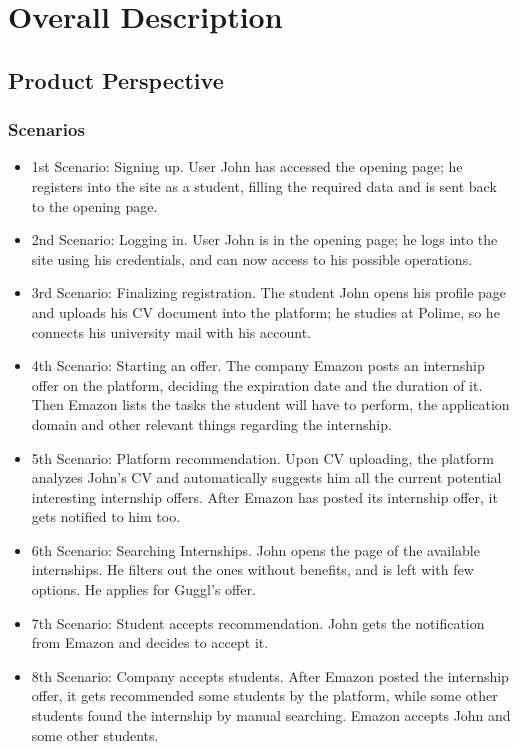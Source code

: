 \documentclass{article}
\begin{document}
\section{Overall Description}
\subsection{Product Perspective}
\subsubsection{Scenarios}
    \begin{itemize}
        \item 1st Scenario: Signing up. User John has accessed the opening page; he registers into the site as a student, filling the required data and is sent back to the opening page.
        \item 2nd Scenario: Logging in. User John is in the opening page; he logs into the site using his credentials, and can now access to his possible operations.
        \item 3rd Scenario: Finalizing registration. The student John opens his profile page and uploads his CV document into the platform; he studies at Polime, so he connects his university mail with his account.
        \item 4th Scenario: Starting an offer. The company Emazon posts an internship offer on the platform, deciding the expiration date and the duration of it. Then Emazon lists the tasks the student will have to perform, the application domain and other relevant things regarding the internship.  
        \item 5th Scenario: Platform recommendation. Upon CV uploading, the   platform analyzes John's CV and automatically suggests him all the current potential interesting internship offers. After Emazon has posted its internship offer, it gets notified to him too.
        \item 6th Scenario: Searching Internships. John opens the page of the available internships. He filters out the ones without benefits, and is left with few options. He applies for Guggl's offer.
        \item 7th Scenario: Student accepts recommendation. John gets the
        notification from Emazon and decides to accept it.
        \item 8th Scenario: Company accepts students. After Emazon posted the internship offer, it gets recommended some students by the platform, while some other students found the internship by manual searching. Emazon accepts John and some other students.

\end{itemize}
\end{document}
